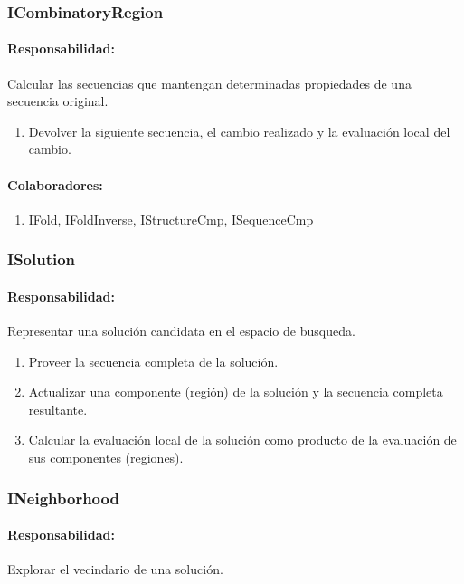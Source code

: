   \subsubsection{ICombinatoryRegion}
    \paragraph{Responsabilidad:} Calcular las secuencias que mantengan
determinadas propiedades de una secuencia original.    
      \begin{enumerate}
       \item Devolver la siguiente secuencia, el cambio realizado y la
evaluaci\'on local del cambio.       
      \end{enumerate}
    \paragraph{Colaboradores:}
      \begin{enumerate}
       \item IFold, IFoldInverse, IStructureCmp, ISequenceCmp
      \end{enumerate}

  \subsubsection{ISolution}
    \paragraph{Responsabilidad:} Representar una soluci\'on candidata en el
espacio de busqueda.
      \begin{enumerate}
       \item Proveer la secuencia completa de la soluci\'on.
       \item Actualizar una componente (regi\'on) de la soluci\'on y la
secuencia completa resultante.
       \item Calcular la evaluaci\'on local de la soluci\'on como producto de
la evaluaci\'on de sus componentes (regiones).
      \end{enumerate}         

  \subsubsection{INeighborhood}
    \paragraph{Responsabilidad:} Explorar el vecindario de una soluci\'on.      
